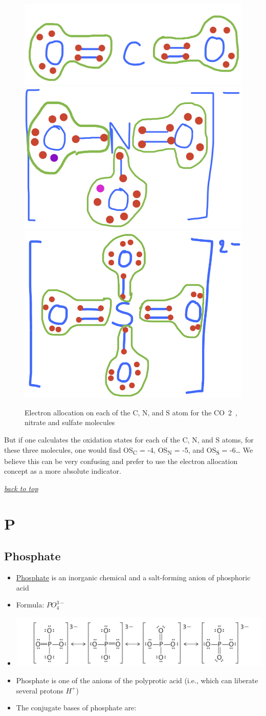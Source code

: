 \documentclass[]{book}
\providecommand{\tightlist}{%
  \setlength{\itemsep}{0pt}\setlength{\parskip}{0pt}}
\theoremstyle{definition}
\theoremstyle{definition}
\theoremstyle{definition}
\theoremstyle{remark}
\begin{document}
\begin{figure}

{\centering \includegraphics[width=0.2\linewidth]{pictures/ElecAlloc_CO2} \includegraphics[width=0.2\linewidth]{pictures/ElecAlloc_NO3-} \includegraphics[width=0.2\linewidth]{pictures/ElecAlloc_SO42-} 

}

\caption{Electron allocation on each of the C, N, and S atom for the CO~2~, nitrate and sulfate molecules}\label{fig:ElecAlloc-CO2-NO3-SO4}
\end{figure}

But if one calculates the oxidation states for each of the C, N, and S
atoms, for these three molecules, one would find OS\textsubscript{C} =
-4, OS\textsubscript{N} = -5, and OS\textsubscript{S} = -6\ldots{} We
believe this can be very confusing and prefer to use the electron
allocation concept as a more absolute indicator.

\emph{\protect\hyperlink{top}{back to top}}

\section{P}\label{p}

\hypertarget{phosphate}{\subsection{Phosphate}\label{phosphate}}

\begin{itemize}
\tightlist
\item
  \href{https://en.wikipedia.org/wiki/Phosphate}{Phosphate} is an
  inorganic chemical and a salt-forming anion of phosphoric acid
\item
  Formula: \(PO_4^{3-}\)
\item
  \includegraphics{pictures/phosphate_lewis_structure.jpg}
\item
  Phosphate is one of the anions of the polyprotic acid (i.e., which can
  liberate several protons \(H^{+}\))
\item
  The conjugate bases of phosphate are:
\end{itemize}
\end{document}
